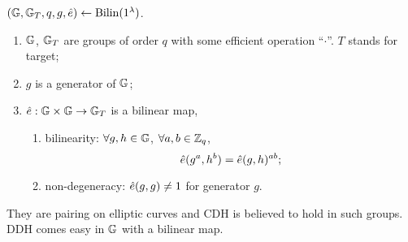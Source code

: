 \begin{definition}
	$\left( \mathbb{G}, \mathbb{G}_{T}, q, g, \hat{e} \right) \leftarrow \mathrm{Bilin}(1^{\lambda})$.
	\begin{enumerate}
		\item $\mathbb{G}$, $\mathbb{G}_{T}$ are groups of order $q$ with some efficient operation ``$\cdot$''.
			$T$ stands for target;
		\item $g$ is a generator of $\mathbb{G}$;
		\item $\hat{e} : \mathbb{G} \times \mathbb{G} \to \mathbb{G}_{T}$ is a bilinear map, \ie
			\begin{enumerate}
				\item bilinearity: $\forall g, h \in \mathbb{G}$, $\forall a, b \in \mathbb{Z}_q$,
					\begin{equation*}
						\hat{e}(g^a, h^b) = \hat{e}(g, h)^{ab};
					\end{equation*}
				\item non-degeneracy: $\hat{e}(g,g) \neq 1$ for generator $g$. \qedhere
			\end{enumerate}
	\end{enumerate}
\end{definition}

\begin{observation}
	They are pairing on elliptic curves and \ac{CDH} is believed to hold in such groups.
	\ac{DDH} comes easy in $\mathbb{G}$ with a bilinear map.
\end{observation}

